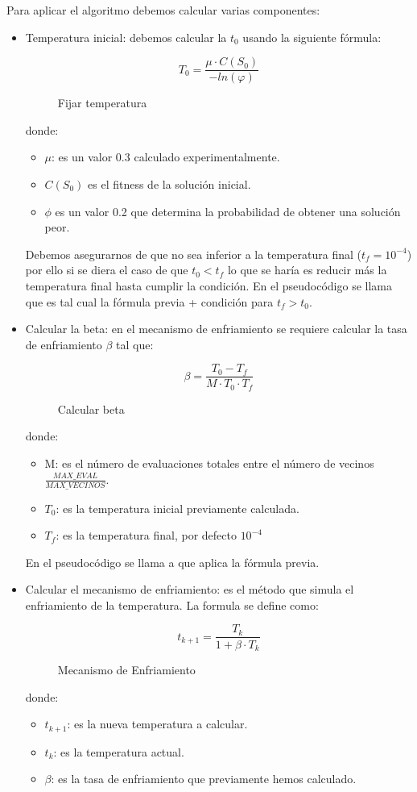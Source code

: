 Para aplicar el algoritmo debemos calcular varias componentes:

\begin{itemize}
 \item Temperatura inicial: debemos calcular la $t_0$ usando la siguiente fórmula:
 \begin{figure}[H]
 	\[
 	T_{0}= \frac{\mu \cdot C(S_0)}{-ln(\varphi)} 
 	\]
 	\caption{Fijar temperatura}
 \end{figure}
 donde:
 \begin{itemize}
 	\item $\mu$: es un valor 0.3 calculado experimentalmente.
 	\item $C(S_0)$ es el fitness de la solución inicial.
 	\item $\phi$ es un valor 0.2 que determina la probabilidad de obtener una solución peor.
 \end{itemize}
 
 Debemos asegurarnos de que no sea inferior a la temperatura final ($t_f=10^{-4}$) por ello si se diera el caso de que $t_0 < t_f$ lo que se haría es reducir más la temperatura final hasta cumplir la condición. En el pseudocódigo se llama  que es tal cual la fórmula previa + condición para $t_f > t_0$.
 
 \item Calcular la beta: en el mecanismo de enfriamiento se requiere calcular la tasa de enfriamiento $\beta$ tal que:
 \begin{figure}[H]
 	\[
 	\beta = \frac{T_0 - T_f}{M \cdot T_0 \cdot T_f}
 	\]
 	\caption{Calcular beta}
 \end{figure}
 donde:
 \begin{itemize}
 	\item M: es el número de evaluaciones totales entre el número de vecinos $\frac{MAX\_EVAL}{MAX\_VECINOS}$.
 	\item $T_0$: es la temperatura inicial previamente calculada.
 	\item $T_f$: es la temperatura final, por defecto $10^{-4}$
 \end{itemize}
 En el pseudocódigo se llama a  que aplica la fórmula previa.
 
 \item Calcular el mecanismo de enfriamiento: es el método que simula el enfriamiento de la temperatura. La formula se define como:
 \begin{figure}[H]
 	\[
 	t_{k+1}= \frac{T_k}{1+ \beta \cdot T_k} 
 	\]
 	\caption{Mecanismo de Enfriamiento}
 \end{figure}
 
 donde:
 \begin{itemize}
 	\item $t_{k+1}$: es la nueva temperatura a calcular.
 	\item $t_k$: es la temperatura actual.
 	\item $\beta$: es la tasa de enfriamiento que previamente hemos calculado.
 \end{itemize}
\end{itemize}

